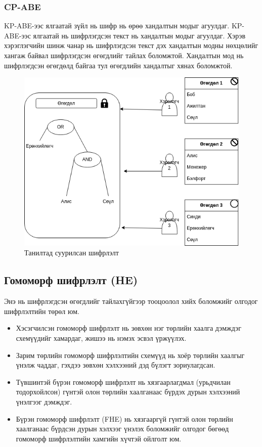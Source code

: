 \subsubsection*{CP-ABE}
KP-ABE-ээс ялгаатай зүйл нь шифр нь өрөө хандалтын модыг агуулдаг. KP-ABE-ээс ялгаатай нь шифрлэгдсэн текст нь хандалтын модыг агуулдаг. Хэрэв хэрэглэгчийн шинж чанар нь шифрлэгдсэн текст дэх хандалтын модны нөхцөлийг хангаж байвал шифрлэгдсэн өгөгдлийг тайлах боломжтой. Хандалтын мод нь шифрлэгдсэн өгөгдөлд байгаа тул өгөгдлийн хандалтыг хянах боломжтой.
\begin{figure}[ht]
    \centering
    \includegraphics[scale=0.6]{Figures/cp-abe.drawio.png}
    \caption[IBE]{Танилтад суурилсан шифрлэлт}
    \label{fig:cp-abe}
\end{figure}

\subsection*{Гомоморф шифрлэлт (HE)}

Энэ нь шифрлэгдсэн өгөгдлийг тайлахгүйгээр тооцоолол хийх боломжийг олгодог шифрлэлтийн төрөл юм.\cite*{WikiHE}

\begin{itemize}
    \item Хэсэгчилсэн гомоморф шифрлэлт нь зөвхөн нэг төрлийн хаалга дэмждэг схемүүдийг хамардаг, жишээ нь нэмэх эсвэл үржүүлэх.
    \item Зарим төрлийн гомоморф шифрлэлтийн схемүүд нь хоёр төрлийн хаалгыг үнэлж чаддаг, гэхдээ зөвхөн хэлхээний дэд бүлэгт зориулагдсан.
    \item Түвшинтэй бүрэн гомоморф шифрлэлт нь хязгаарлагдмал (урьдчилан тодорхойлсон) гүнтэй олон төрлийн хаалганаас бүрдэх дурын хэлхээний үнэлгээг дэмждэг.
    \item Бүрэн гомоморф шифрлэлт (FHE) нь хязгааргүй гүнтэй олон төрлийн хаалганаас бүрдсэн дурын хэлхээг үнэлэх боломжийг олгодог бөгөөд гомоморф шифрлэлтийн хамгийн хүчтэй ойлголт юм.
\end{itemize}

